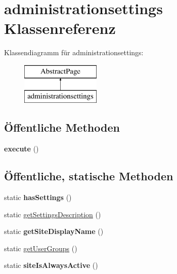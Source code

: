 \hypertarget{classadministrationsettings}{}\section{administrationsettings Klassenreferenz}
\label{classadministrationsettings}
Klassendiagramm für administrationsettings\+:\begin{figure}[H]
\begin{center}
\leavevmode
\includegraphics[height=2.000000cm]{classadministrationsettings}
\end{center}
\end{figure}
\subsection*{Öffentliche Methoden}
\begin{DoxyCompactItemize}
\item 
\mbox{\label{classadministrationsettings_a2b23702dbbaa00fb5440b9050f5156d0}} 
{\bfseries execute} ()
\end{DoxyCompactItemize}
\subsection*{Öffentliche, statische Methoden}
\begin{DoxyCompactItemize}
\item 
\mbox{\label{classadministrationsettings_a1d4c52e2db237ad7e61f1b8771d1d674}} 
static {\bfseries has\+Settings} ()
\item 
static \mbox{\hyperlink{classadministrationsettings_a7cf7753b06a6151e9437419796019f8e}{get\+Settings\+Description}} ()
\item 
\mbox{\label{classadministrationsettings_a009fcda5c9824db426826d29b27f5994}} 
static {\bfseries get\+Site\+Display\+Name} ()
\item 
static \mbox{\hyperlink{classadministrationsettings_ac77f0d334382272f859a85a6f19c6353}{get\+User\+Groups}} ()
\item 
\mbox{\label{classadministrationsettings_abbeb362e6f2f129d6b88f68ce006ac13}} 
static {\bfseries site\+Is\+Always\+Active} ()
\end{DoxyCompactItemize}
